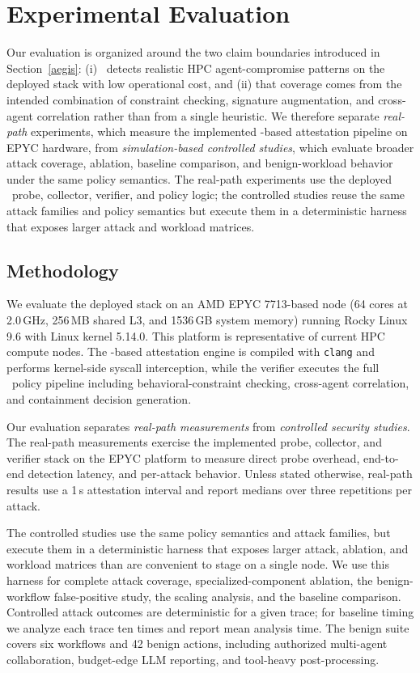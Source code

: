 \section{Experimental Evaluation}
\label{results}

Our evaluation is organized around the two claim boundaries introduced in
Section~\ref{aegis}: (i) \projectname~detects realistic HPC agent-compromise
patterns on the deployed stack with low operational cost, and (ii) that
coverage comes from the intended combination of constraint checking,
signature augmentation, and cross-agent correlation rather than from a single
heuristic. We therefore separate \emph{real-path} experiments, which measure the
implemented \ebpf-based attestation pipeline on EPYC hardware, from
\emph{simulation-based controlled studies}, which evaluate broader attack
coverage, ablation, baseline comparison, and benign-workload behavior under the
same policy semantics. The real-path experiments use the deployed
\projectname~probe, collector, verifier, and policy logic; the controlled
studies reuse the same attack families and policy semantics but execute them in
a deterministic harness that exposes larger attack and workload matrices.

\subsection{Methodology}

We evaluate the deployed stack on an AMD EPYC 7713-based node (64 cores at
2.0\,GHz, 256\,MB shared L3, and 1536\,GB system memory) running Rocky Linux
9.6 with Linux kernel 5.14.0. This platform is representative of current HPC
compute nodes. The \ebpf-based attestation engine is compiled with
\texttt{clang} and performs kernel-side syscall interception, while the
verifier executes the full \projectname~policy pipeline including
behavioral-constraint checking, cross-agent correlation, and containment
decision generation.

Our evaluation separates \emph{real-path measurements} from
\emph{controlled security studies}. The real-path measurements exercise the
implemented probe, collector, and verifier stack on the EPYC platform to
measure direct probe overhead, end-to-end detection latency, and per-attack
behavior. Unless stated otherwise, real-path results use a 1\,s attestation
interval and report medians over three repetitions per attack.

The controlled studies use the same policy semantics and attack families, but
execute them in a deterministic harness that exposes larger attack, ablation,
and workload matrices than are convenient to stage on a single node. We use
this harness for complete attack coverage, specialized-component ablation, the
benign-workflow false-positive study, the scaling analysis, and the baseline
comparison. Controlled attack outcomes are deterministic for a given trace; for
baseline timing we analyze each trace ten times and report mean analysis time.
The benign suite covers six workflows and 42 benign actions, including
authorized multi-agent collaboration, budget-edge LLM reporting, and tool-heavy
post-processing.

